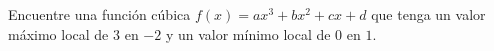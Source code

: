 \item Encuentre una función cúbica $f(x) = ax^3 + bx^2 + cx + d$ que tenga un valor máximo local de $3$ en $-2$ y un valor mínimo local de $0$ en $1$.
